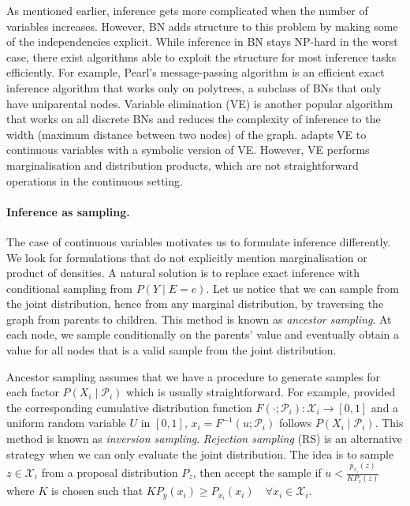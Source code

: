 As mentioned earlier, inference gets more complicated when the number of variables increases. However, BN adds structure to this problem by making some of the independencies explicit. While inference in BN stays NP-hard in the worst case, there exist algorithms able to exploit the structure for most inference tasks efficiently. For example, Pearl's message-passing algorithm is an efficient exact inference algorithm that works only on polytrees, a subclass of BNs that only have uniparental nodes. Variable elimination (VE) is another popular algorithm that works on all discrete BNs and reduces the complexity of inference to the width (maximum distance between two nodes) of the graph. \citet{sanner2012symbolic} adapts VE to continuous variables with a symbolic version of VE. However, VE performs marginalisation and distribution products, which are not straightforward operations in the continuous setting.

\paragraph{Inference as sampling.}
The case of continuous variables motivates us to formulate inference differently. We look for formulations that do not explicitly mention marginalisation or product of densities. A natural solution is to replace exact inference with conditional sampling from $P(Y\mid E=e)$. Let us notice that we can sample from the joint distribution, hence from any marginal distribution, by traversing the graph from parents to children. This method is known as \textit{ancestor sampling}. At each node, we sample conditionally on the parents' value and eventually obtain a value for all nodes that is a valid sample from the joint distribution.

Ancestor sampling assumes that we have a procedure to generate samples for each factor $P(X_i\mid \mathcal{P}_i)$ which is usually straightforward. For example, provided the corresponding cumulative distribution function $F(\cdot;\mathcal{P}_i): \mathcal{X}_i \rightarrow \left[0, 1 \right]$ and a uniform random variable $U$ in $\left[0, 1\right]$, $x_i=F^{-1}(u;\mathcal{P}_i)$ follows $P(X_i\mid \mathcal{P}_i)$. This method is known as \textit{inversion sampling}. \textit{Rejection sampling} (RS) is an alternative strategy when we can only evaluate the joint distribution. The idea is to sample $z \in \mathcal{X}_i$ from a proposal distribution $P_z$, then accept the sample if $u< \frac{p_{x_i}(z)}{K P_z(z)} $ where $K$ is chosen such that $ K P_y(x_i) \geq P_{x_i}(x_i) \quad \forall x_i \in \mathcal{X}_i$.


